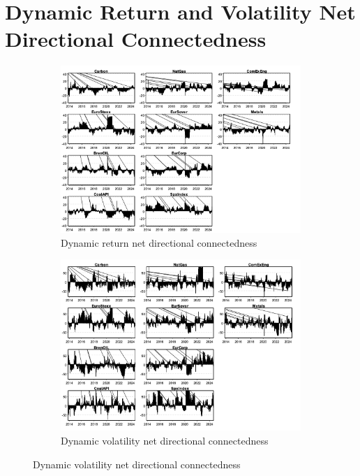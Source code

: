 \documentclass[preprint, 3p,
authoryear]{elsarticle} %
\begin{document}
\section{Dynamic Return and Volatility Net Directional Connectedness}
\label{appendix:b}
\begin{figure}[H]
  \caption{Dynamic Net Directional Connectedness (Jan 2013 – Aug 2024)}
  \label{fig:dynNDCfull}
      \begin{subfigure}[H]{\textwidth}
        \centering
        \caption{Dynamic return net directional connectedness}
        \label{fig:dynretNDCfull}
        \includegraphics[width =\textwidth]{../figures/6a-AppBa-DynRetNDCfull}
      \end{subfigure}
    \bigskip
      \begin{subfigure}[H]{\textwidth}
        \centering
        \caption{Dynamic volatility net directional connectedness}
        \label{fig:dynvolNDCfull}
        \includegraphics[width = \textwidth]{../figures/6b-AppBb-DynVolNDCfull}
      \end{subfigure}
\end{figure}
\end{document}
